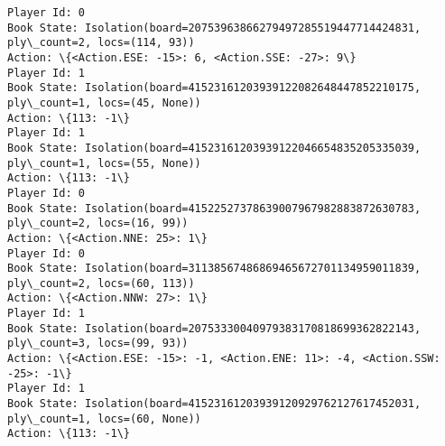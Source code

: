 \documentclass[11pt]{article}
\begin{document}
\begin{Verbatim}[commandchars=\\\{\}]
Player Id: 0
Book State: Isolation(board=20753963866279497285519447714424831, ply\_count=2, locs=(114, 93))
Action: \{<Action.ESE: -15>: 6, <Action.SSE: -27>: 9\}
Player Id: 1
Book State: Isolation(board=41523161203939122082648447852210175, ply\_count=1, locs=(45, None))
Action: \{113: -1\}
Player Id: 1
Book State: Isolation(board=41523161203939122046654835205335039, ply\_count=1, locs=(55, None))
Action: \{113: -1\}
Player Id: 0
Book State: Isolation(board=41522527378639007967982883872630783, ply\_count=2, locs=(16, 99))
Action: \{<Action.NNE: 25>: 1\}
Player Id: 0
Book State: Isolation(board=31138567486869465672701134959011839, ply\_count=2, locs=(60, 113))
Action: \{<Action.NNW: 27>: 1\}
Player Id: 1
Book State: Isolation(board=20753330040979383170818699362822143, ply\_count=3, locs=(99, 93))
Action: \{<Action.ESE: -15>: -1, <Action.ENE: 11>: -4, <Action.SSW: -25>: -1\}
Player Id: 1
Book State: Isolation(board=41523161203939120929762127617452031, ply\_count=1, locs=(60, None))
Action: \{113: -1\}


\end{Verbatim}
\end{document}
